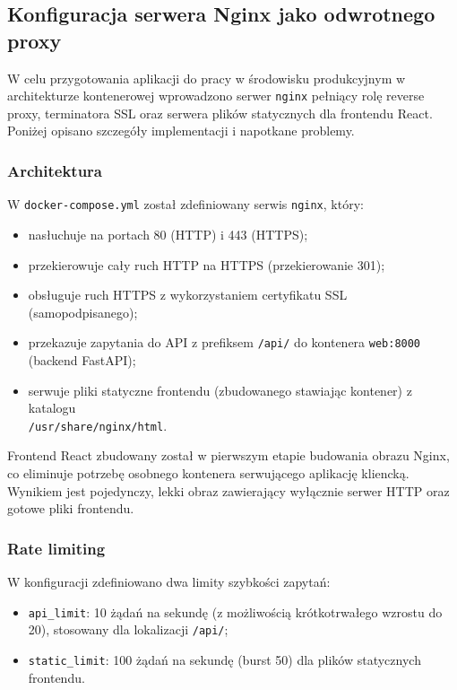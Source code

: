 \documentclass[12pt,a4paper]{article}
\begin{document}
\subsection{Konfiguracja serwera Nginx jako odwrotnego proxy}
W celu przygotowania aplikacji do pracy w środowisku produkcyjnym w architekturze kontenerowej wprowadzono serwer \texttt{nginx} pełniący rolę reverse proxy, terminatora SSL oraz serwera plików statycznych dla frontendu React. Poniżej opisano szczegóły implementacji i napotkane problemy.

\subsubsection{Architektura}
W \texttt{docker-compose.yml} został zdefiniowany serwis \texttt{nginx}, który:
\begin{itemize}
    \item nasłuchuje na portach 80 (HTTP) i 443 (HTTPS);
    \item przekierowuje cały ruch HTTP na HTTPS (przekierowanie 301);
    \item obsługuje ruch HTTPS z wykorzystaniem certyfikatu SSL (samopodpisanego);
    \item przekazuje zapytania do API z prefiksem \texttt{/api/} do kontenera \texttt{web:8000} (backend FastAPI);
    \item serwuje pliki statyczne frontendu (zbudowanego stawiając kontener) z katalogu \\\texttt{/usr/share/nginx/html}.
\end{itemize}

Frontend React zbudowany został w pierwszym etapie budowania obrazu Nginx, co eliminuje potrzebę osobnego kontenera serwującego aplikację kliencką. Wynikiem jest pojedynczy, lekki obraz zawierający wyłącznie serwer HTTP oraz gotowe pliki frontendu.

\subsubsection{Rate limiting}
W konfiguracji zdefiniowano dwa limity szybkości zapytań:
\begin{itemize}
    \item \texttt{api\_limit}: 10 żądań na sekundę (z możliwością krótkotrwałego wzrostu do 20), stosowany dla lokalizacji \texttt{/api/};
    \item \texttt{static\_limit}: 100 żądań na sekundę (burst 50) dla plików statycznych frontendu.
\end{itemize}
\end{document}
